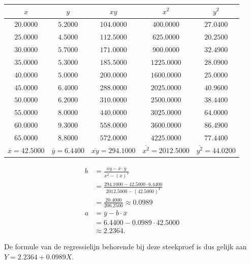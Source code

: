 \documentclass{article}
\begin{document}
    \begin{center}
            \begin{tabular}{ccccc}
                \toprule
                    $x$ & $y$ & $xy$ & $x^2$ & $y^2$ \\
                \midrule
    		$20.0000$ & $5.2000$ & $104.0000$ & $400.0000$ & $27.0400$ \\
		$25.0000$ & $4.5000$ & $112.5000$ & $625.0000$ & $20.2500$ \\
		$30.0000$ & $5.7000$ & $171.0000$ & $900.0000$ & $32.4900$ \\
		$35.0000$ & $5.3000$ & $185.5000$ & $1225.0000$ & $28.0900$ \\
		$40.0000$ & $5.0000$ & $200.0000$ & $1600.0000$ & $25.0000$ \\
		$45.0000$ & $6.4000$ & $288.0000$ & $2025.0000$ & $40.9600$ \\
		$50.0000$ & $6.2000$ & $310.0000$ & $2500.0000$ & $38.4400$ \\
		$55.0000$ & $8.0000$ & $440.0000$ & $3025.0000$ & $64.0000$ \\
		$60.0000$ & $9.3000$ & $558.0000$ & $3600.0000$ & $86.4900$ \\
		$65.0000$ & $8.8000$ & $572.0000$ & $4225.0000$ & $77.4400$ \\

                \midrule
                    $\overline{x} = 42.5000$ & $\overline{y} = 6.4400$ & $\overline{xy} = 294.1000$ & $\overline{x^2} = 2012.5000$ & $\overline{y^2} = 44.0200$ \\
                \bottomrule
            \end{tabular}
        \end{center}
    

        \begin{align*}
            b &= \frac{\overline{xy} - \overline{x} \cdot \overline{y}}{\overline{x^2} - (\overline{x})^2} \\
              &= \frac{294.1000 - 42.5000 \cdot 6.4400}{2012.5000 - (42.5000)^2} \\
              &= \frac{20.4000}{206.2500} \approx 0.0989 \\
            a &= \overline{y} - b \cdot \overline{x} \\
              &= 6.4400 - 0.0989 \cdot 42.5000 \\
              &\approx 2.2364.
        \end{align*}

        De formule van de regressielijn behorende bij deze steekproef is dus gelijk aan $Y = 2.2364+0.0989X$.
    
\end{document}
